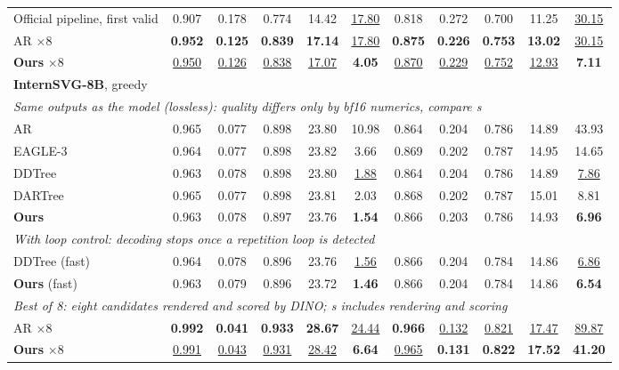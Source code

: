\begin{table}[t]
\begin{tabular*}{\textwidth}{@{\extracolsep{\fill}}l*{10}{c}@{}}
Official pipeline, first valid & 0.907 & 0.178 & 0.774 & 14.42 & \underline{17.80} & 0.818 & 0.272 & 0.700 & 11.25 & \underline{30.15} \\
AR $\times$8 & \textbf{0.952} & \textbf{0.125} & \textbf{0.839} & \textbf{17.14} & \underline{17.80} & \textbf{0.875} & \textbf{0.226} & \textbf{0.753} & \textbf{13.02} & \underline{30.15} \\
\textbf{Ours} $\times$8 & \underline{0.950} & \underline{0.126} & \underline{0.838} & \underline{17.07} & \textbf{4.05} & \underline{0.870} & \underline{0.229} & \underline{0.752} & \underline{12.93} & \textbf{7.11} \\
\midrule
\multicolumn{11}{l}{\textbf{InternSVG-8B}, greedy} \\
\multicolumn{11}{l}{\hspace{0.6em}\textit{Same outputs as the model (lossless): quality differs only by bf16 numerics, compare s}} \\
AR & 0.965 & 0.077 & 0.898 & 23.80 & 10.98 & 0.864 & 0.204 & 0.786 & 14.89 & 43.93 \\
EAGLE-3 & 0.964 & 0.077 & 0.898 & 23.82 & 3.66 & 0.869 & 0.202 & 0.787 & 14.95 & 14.65 \\
DDTree & 0.963 & 0.078 & 0.898 & 23.80 & \underline{1.88} & 0.864 & 0.204 & 0.786 & 14.89 & \underline{7.86} \\
DARTree & 0.965 & 0.077 & 0.898 & 23.81 & 2.03 & 0.868 & 0.202 & 0.787 & 15.01 & 8.81 \\
\textbf{Ours} & 0.963 & 0.078 & 0.897 & 23.76 & \textbf{1.54} & 0.866 & 0.203 & 0.786 & 14.93 & \textbf{6.96} \\
\multicolumn{11}{l}{\hspace{0.6em}\textit{With loop control: decoding stops once a repetition loop is detected}} \\
DDTree (fast) & 0.964 & 0.078 & 0.896 & 23.76 & \underline{1.56} & 0.866 & 0.204 & 0.784 & 14.86 & \underline{6.86} \\
\textbf{Ours} (fast) & 0.963 & 0.079 & 0.896 & 23.72 & \textbf{1.46} & 0.866 & 0.204 & 0.784 & 14.86 & \textbf{6.54} \\
\multicolumn{11}{l}{\hspace{0.6em}\textit{Best of 8: eight candidates rendered and scored by DINO; s includes rendering and scoring}} \\
AR $\times$8 & \textbf{0.992} & \textbf{0.041} & \textbf{0.933} & \textbf{28.67} & \underline{24.44} & \textbf{0.966} & \underline{0.132} & \underline{0.821} & \underline{17.47} & \underline{89.87} \\
\textbf{Ours} $\times$8 & \underline{0.991} & \underline{0.043} & \underline{0.931} & \underline{28.42} & \textbf{6.64} & \underline{0.965} & \textbf{0.131} & \textbf{0.822} & \textbf{17.52} & \textbf{41.20} \\
\bottomrule
\end{tabular*}
\end{table}
